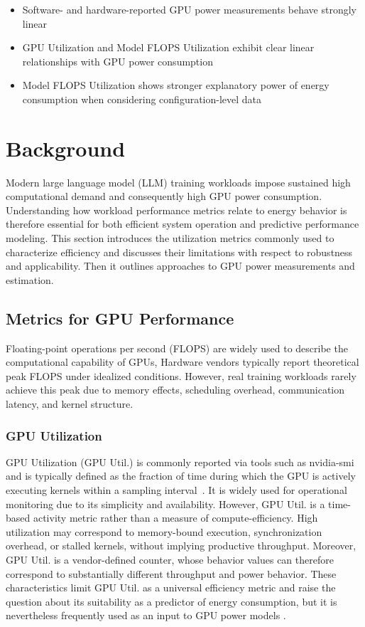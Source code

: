 \documentclass[runningheads]{llncs}
\begin{document}
\begin{itemize}
    \item Software- and hardware-reported GPU power measurements behave strongly linear
    \item GPU Utilization and Model FLOPS Utilization exhibit clear linear relationships with GPU power consumption
    \item Model FLOPS Utilization shows stronger explanatory power of energy consumption when considering configuration-level data
\end{itemize}


\section{Background}\label{Background}
Modern large language model (LLM) training workloads impose sustained high computational demand and consequently high GPU power consumption. Understanding how workload performance metrics relate to energy behavior is therefore essential for both efficient system operation and predictive performance modeling. This section introduces the utilization metrics commonly used to characterize efficiency and discusses their limitations with respect to robustness and applicability. Then it outlines approaches to GPU power measurements and estimation. 


\subsection{Metrics for GPU Performance} \label{GPU performance metrics}
Floating-point operations per second (FLOPS) are widely used to describe the computational capability of GPUs, Hardware vendors typically report theoretical peak FLOPS under idealized conditions. However, real training workloads rarely achieve this peak due to memory effects, scheduling overhead, communication latency, and kernel structure.


\subsubsection{GPU Utilization}
GPU Utilization (GPU Util.) is commonly reported via tools such as nvidia-smi and is typically defined as the fraction of time during which the GPU is actively executing kernels within a sampling interval~\cite{cornelius-2025, nvidia-no-dateA}. It is widely used for operational monitoring due to its simplicity and availability.
However, GPU Util. is a time-based activity metric rather than a measure of compute-efficiency. High utilization may correspond to memory-bound execution, synchronization overhead, or stalled kernels, without implying productive throughput. Moreover, GPU Util. is a vendor-defined counter, whose behavior values can therefore correspond to substantially different throughput and power behavior. These characteristics limit GPU Util. as a universal efficiency metric and raise the question about its suitability as a predictor of energy consumption, but it is nevertheless frequently used as an input to GPU power models \cite{antarctica-2025, bridges-2016}.
\end{document}
